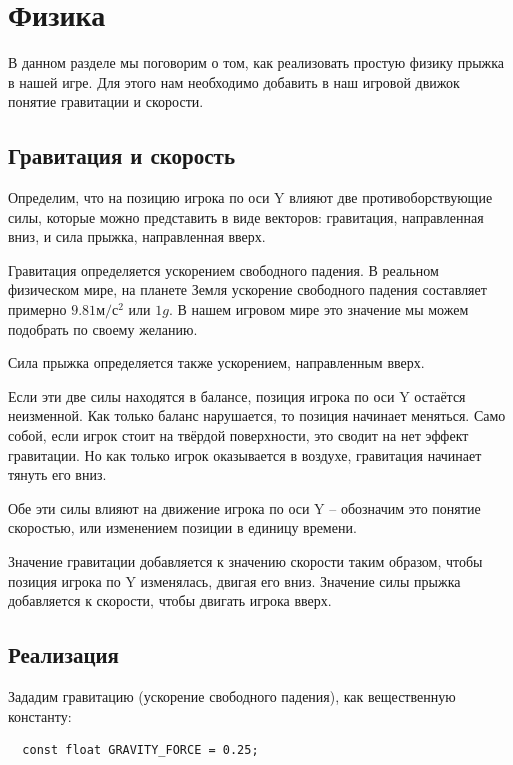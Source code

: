 \documentclass[../sparc.tex]{subfiles}
\begin{document}
\newpage
\section{Физика}

В данном разделе мы поговорим о том, как реализовать простую физику прыжка в
нашей игре.  Для этого нам необходимо добавить в наш игровой движок понятие
гравитации и скорости.

\subsection{Гравитация и скорость}

Определим, что на позицию игрока по оси Y влияют две противоборствующие силы,
которые можно представить в виде векторов: гравитация, направленная вниз, и сила
прыжка, направленная вверх.

Гравитация определяется ускорением свободного падения.  В реальном физическом
мире, на планете Земля ускорение свободного падения составляет примерно $9.81
\mbox{м}/\mbox{с}^{2}$ или $1g$.  В нашем игровом мире это значение мы можем
подобрать по своему желанию.

Сила прыжка определяется также ускорением, направленным вверх.

Если эти две силы находятся в балансе, позиция игрока по оси Y остаётся
неизменной.  Как только баланс нарушается, то позиция начинает меняться.  Само
собой, если игрок стоит на твёрдой поверхности, это сводит на нет эффект
гравитации.  Но как только игрок оказывается в воздухе, гравитация начинает
тянуть его вниз.

Обе эти силы влияют на движение игрока по оси Y -- обозначим это понятие
скоростью, или изменением позиции в единицу времени.

Значение гравитации добавляется к значению скорости таким образом, чтобы позиция
игрока по Y изменялась, двигая его вниз.  Значение силы прыжка добавляется к
скорости, чтобы двигать игрока вверх.

\subsection{Реализация}

Зададим гравитацию (ускорение свободного падения), как вещественную константу:
\begin{verbatim}
  const float GRAVITY_FORCE = 0.25;
\end{verbatim}
\end{document}
